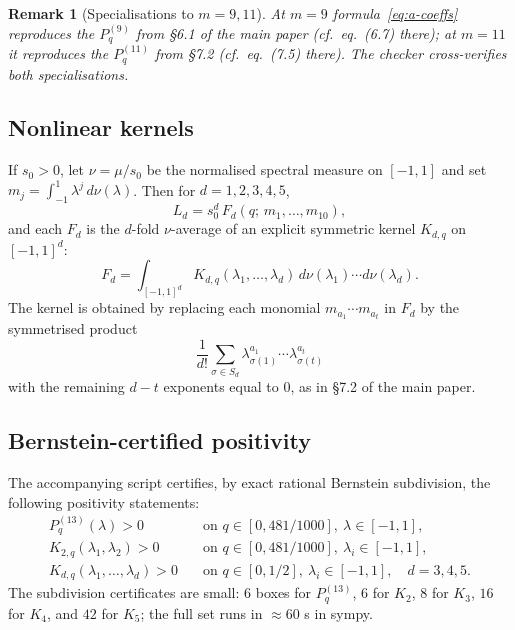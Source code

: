 \documentclass[11pt]{article}
\newtheorem{remark}[theorem]{Remark}
\begin{document}
\begin{remark}[Specialisations to $m = 9, 11$]
At $m = 9$ formula~\eqref{eq:a-coeffs} reproduces the $P_q^{(9)}$ from \S 6.1 of the main paper (cf.\ eq.~(6.7) there); at $m = 11$ it reproduces the $P_q^{(11)}$ from \S 7.2 (cf.\ eq.~(7.5) there).  The checker cross-verifies both specialisations.
\end{remark}

\subsection{Nonlinear kernels}

If $s_0 > 0$, let $\nu = \mu/s_0$ be the normalised spectral measure on $[-1, 1]$ and set $m_j = \int_{-1}^1 \lambda^j\, d\nu(\lambda)$.  Then for $d = 1, 2, 3, 4, 5$,
\[
        L_d = s_0^d\, F_d(q;\, m_1, \ldots, m_{10}),
\]
and each $F_d$ is the $d$-fold $\nu$-average of an explicit symmetric kernel $K_{d, q}$ on $[-1, 1]^d$:
\[
        F_d = \int_{[-1, 1]^d} K_{d, q}(\lambda_1, \ldots, \lambda_d)\, d\nu(\lambda_1) \cdots d\nu(\lambda_d).
\]
The kernel is obtained by replacing each monomial $m_{a_1} \cdots m_{a_t}$ in $F_d$ by the symmetrised product
\[
        \frac{1}{d!} \sum_{\sigma \in S_d} \lambda_{\sigma(1)}^{a_1} \cdots \lambda_{\sigma(t)}^{a_t}
\]
with the remaining $d - t$ exponents equal to $0$, as in \S 7.2 of the main paper.

\subsection{Bernstein-certified positivity}

The accompanying script certifies, by exact rational Bernstein subdivision, the following positivity statements:
\begin{align}
P_q^{(13)}(\lambda) > 0 & \quad \text{on } q \in [0, 481/1000],\ \lambda \in [-1, 1], \label{eq:Pq-positive-C13} \\
K_{2, q}(\lambda_1, \lambda_2) > 0 & \quad \text{on } q \in [0, 481/1000],\ \lambda_i \in [-1, 1], \label{eq:K2-positive-C13} \\
K_{d, q}(\lambda_1, \ldots, \lambda_d) > 0 & \quad \text{on } q \in [0, 1/2],\ \lambda_i \in [-1, 1], \quad d = 3, 4, 5. \label{eq:Kd-positive-C13}
\end{align}
The subdivision certificates are small: $6$ boxes for $P_q^{(13)}$, $6$ for $K_2$, $8$ for $K_3$, $16$ for $K_4$, and $42$ for $K_5$; the full set runs in $\approx 60$ s in sympy.
\end{document}
